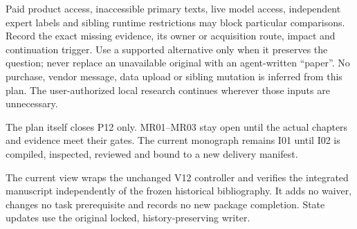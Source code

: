 \documentclass[
  11pt,
  a4paper,
]{article}
\begin{document}
Paid product access, inaccessible primary texts, live model access,
independent expert labels and sibling runtime restrictions may block
particular comparisons. Record the exact missing evidence, its owner or
acquisition route, impact and continuation trigger. Use a supported
alternative only when it preserves the question; never replace an
unavailable original with an agent-written ``paper''. No purchase,
vendor message, data upload or sibling mutation is inferred from this
plan. The user-authorized local research continues wherever those inputs
are unnecessary.

The plan itself closes P12 only. MR01--MR03 stay open until the actual
chapters and evidence meet their gates. The current monograph remains
I01 until I02 is compiled, inspected, reviewed and bound to a new
delivery manifest.

The current view wraps the unchanged V12 controller and verifies the
integrated manuscript independently of the frozen historical
bibliography. It adds no waiver, changes no task prerequisite and
records no new package completion. State updates use the original
locked, history-preserving writer.
\end{document}
